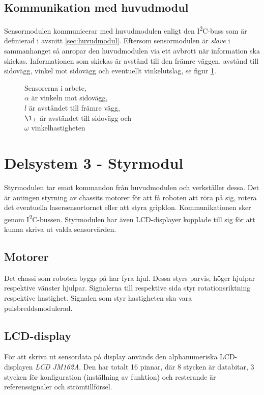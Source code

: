 \documentclass[11pt]{article}
\begin{document}
\begin{flushleft}
\subsection{Kommunikation med huvudmodul}
Sensormodulen kommunicerar med huvudmodulen enligt den I\textsuperscript{2}C-buss som är definierad i avsnitt \ref{sec:huvudmodul}. Eftersom sensormodulen är \emph{slave} i sammanhanget så anropar den huvudmodulen via ett avbrott när information ska skickas. Informationen som skickas är avstånd till den främre väggen, avstånd till sidovägg, vinkel mot sidovägg och eventuellt vinkelutslag, se figur \ref{measurements}. 

\begin{figure}[htbp]
\centering

\noindent\resizebox{.5\textwidth}{!}{
	}
	\captionsetup{justification=centering}
	\caption{Sensorerna i arbete, \\ $\alpha$ är vinkeln mot sidovägg, \\ $l$ är avståndet till främre vägg, \\ $\l_{\perp}$ är avständet till sidovägg och \\ $\omega$ vinkelhastigheten}
	\label{measurements}
\end{figure}
\pagebreak
\section{Delsystem 3 - Styrmodul}
Styrmodulen tar emot kommandon från huvudmodulen och verkställer dessa. Det är antingen styrning av chassits motorer för att få roboten att röra på sig, rotera det eventuella lasersensortornet eller att styra gripklon. Kommunikationen sker genom I\textsuperscript{2}C-bussen. Styrmodulen har även LCD-displayer kopplade till sig för att kunna skriva ut valda sensorvärden.
\subsection{Motorer}
Det chassi som roboten byggs på har fyra hjul. Dessa styrs parvis, höger hjulpar respektive vänster hjulpar. Signalerna till respektive sida styr rotationsriktning respektive hastighet. Signalen som styr hastigheten ska vara pulsbreddsmodulerad.
\subsection{LCD-display}
För att skriva ut sensordata på display används den alphanumeriska LCD-displayen \textit{LCD JM162A}. Den har totalt 16 pinnar, där 8 stycken är databitar, 3 stycken för konfiguration (inställning av funktion) och resterande är referenssignaler och strömtillförsel.


\end{flushleft}
\end{document}
